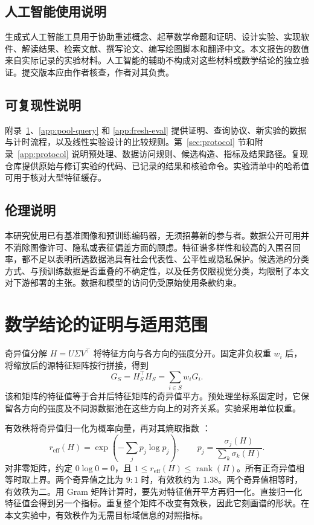 \documentclass[UTF8,fontset=fandol,scheme=chinese,zihao=false,11pt,letterpaper]{ctexart}
\newcommand{\reff}{r_{\mathrm{eff}}}
\begin{document}
\label{main-text-end}

\subsection*{人工智能使用说明}
生成式人工智能工具用于协助重述概念、起草数学命题和证明、设计实验、实现软件、解读结果、检索文献、撰写论文、编写绘图脚本和翻译中文。本文报告的数值来自实际记录的实验材料。人工智能的辅助不构成对这些材料或数学结论的独立验证。提交版本应由作者核查，作者对其负责。

\subsection*{可复现性说明}
附录~\ref{app:proofs}、\ref{app:pool-query} 和 \ref{app:fresh-eval} 提供证明、查询协议、新实验的数据与计时流程，以及线性实验设计的比较规则。第~\ref{sec:protocol} 节和附录~\ref{app:protocol} 说明预处理、数据访问规则、候选构造、指标及结果路径。复现仓库提供原始与修订实验的代码、已记录的结果和核验命令。实验清单中的哈希值可用于核对大型特征缓存。

\subsection*{伦理说明}
本研究使用已有基准图像和预训练编码器，无须招募新的参与者。数据公开可用并不消除图像许可、隐私或表征偏差方面的顾虑。特征谱多样性和较高的入围召回率，都不足以表明所选数据池具有社会代表性、公平性或隐私保护。候选池的分类方式、与预训练数据是否重叠的不确定性，以及任务仅限视觉分类，均限制了本文对下游部署的主张。数据和模型的访问仍受原始使用条款约束。



\clearpage
\appendix

\section{数学结论的证明与适用范围}
\label{app:proofs}
奇异值分解 $H=U\Sigma V^\top$ 将特征方向与各方向的强度分开。固定非负权重 $w_i$ 后，将缩放后的源特征矩阵按行拼接，得到
\begin{equation}
 G_S=H_S^\top H_S=\sum_{i\in S}w_iG_i.
 \label{eq:gram}
\end{equation}
该和矩阵的特征值等于合并后特征矩阵的奇异值平方。预处理坐标系固定时，它保留各方向的强度及不同源数据池在这些方向上的对齐关系。实验采用单位权重。

有效秩将奇异值归一化为概率向量，再对其熵取指数 \citep{roy2007}：
\begin{equation}
 \reff(H)=\exp\!\left(-\sum_j p_j\log p_j\right),\qquad
 p_j=\frac{\sigma_j(H)}{\sum_k\sigma_k(H)}.
 \label{eq:rank}
\end{equation}
对非零矩阵，约定 $0\log0=0$，且 $1\leq\reff(H)\leq\operatorname{rank}(H)$。所有正奇异值相等时取上界。两个奇异值之比为 $9:1$ 时，有效秩约为 $1.38$。两个奇异值相等时，有效秩为二。用 Gram 矩阵计算时，要先对特征值开平方再归一化。直接归一化特征值会得到另一个指标。重复整个矩阵不改变有效秩，因此它刻画谱的形状。在本文实验中，有效秩作为无需目标域信息的对照指标。
\end{document}
